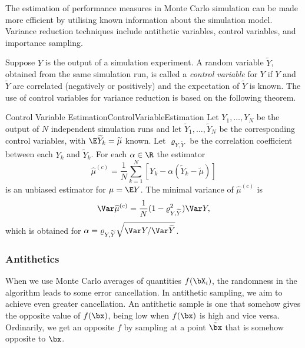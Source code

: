The estimation of performance measures in Monte Carlo simulation can be made more efficient by utilising known information about the simulation model. Variance reduction techniques include antithetic variables, control variables, and importance sampling.

Suppose $Y$ is the output of a simulation experiment. A random variable $\widetilde{Y}$, obtained from the same simulation run, is called a \textit{control variable} for $Y$ if $Y$ and $\widetilde{Y}$ are correlated (negatively or positively) and the expectation of $\widetilde{Y}$ is known. The use of control variables for variance reduction is based on the following theorem.

\begin{thm}{Control Variable Estimation}{ControlVariableEstimation}
	Let $Y_1, \dots, Y_N$ be the output of $N$ independent simulation runs and let $\widetilde{Y}_1, \dots, \widetilde{Y}_N$ be the corresponding control variables, with $\E \widetilde{Y}_k = \widetilde{\mu}$ known. Let $\varrho_{Y, \widetilde{Y}}$ be the correlation coefficient between each $Y_k$ and $\widetilde{Y}_k$. For each $\alpha \in \R$ the estimator
	\begin{equation} \label{eq:ControlVariateEstimator}
		\widehat{\mu}^{(c)} = \frac{1}{N} \sum_{k=1}^N \left[ Y_k - \alpha \left( \widetilde{Y}_k - \widetilde{\mu} \right) \right]
	\end{equation}
	is an unbiased estimator for $\mu = \E Y$. The minimal variance of $\widehat{\mu}^{(c)}$ is
	\begin{equation} \label{eq:MinimalVarianceControlVariate}
		\Var \widehat{\mu}^{(c)} = \frac{1}{N} (1 - \varrho_{Y, \widetilde{Y}}^2) \Var Y,
	\end{equation}
	which is obtained for $\alpha = \varrho_{Y, \widetilde{Y}} \sqrt{\Var Y / \Var \widetilde{Y}}$.
\end{thm}

\subsubsection{Antithetics}
When we use Monte Carlo averages of quantities $f(\bX_i)$, the randomness in the algorithm leads to some error cancellation. In antithetic sampling, we aim to achieve even greater cancellation. An antithetic sample is one that somehow gives the opposite value of $f(\bx)$, being low when $f(\bx)$ is high and vice versa. Ordinarily, we get an opposite $f$ by sampling at a point $\tilde{\bx}$ that is somehow opposite to $\bx$.

